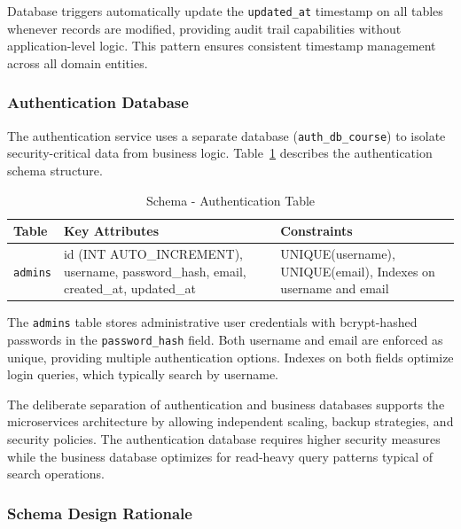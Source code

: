 \documentclass[12pt,a4paper]{article}
\begin{document}
Database triggers automatically update the \texttt{updated\_at} timestamp on all tables whenever records are modified, providing audit trail capabilities without application-level logic. This pattern ensures consistent timestamp management across all domain entities.

\subsubsection{Authentication Database}

The authentication service uses a separate database (\texttt{auth\_db\_course}) to isolate security-critical data from business logic. Table~\ref{tab:mysql_schema} describes the authentication schema structure.\newline

\begin{table}[htbp]
	\centering
	\caption{Schema - Authentication Table}
	\label{tab:mysql_schema}
	\small
	\begin{tabular}{@{}lp{6cm}p{3cm}@{}}
		\toprule
		\textbf{Table} & \textbf{Key Attributes} & \textbf{Constraints} \\ 
		\midrule
		\texttt{admins} & id (INT AUTO\_INCREMENT), username, password\_hash, email, created\_at, updated\_at & UNIQUE(username), UNIQUE(email), Indexes on username and email \\
		\bottomrule
	\end{tabular}
\end{table}

The \texttt{admins} table stores administrative user credentials with bcrypt-hashed passwords in the \texttt{password\_hash} field. Both username and email are enforced as unique, providing multiple authentication options. Indexes on both fields optimize login queries, which typically search by username.\newline

The deliberate separation of authentication and business databases supports the microservices architecture by allowing independent scaling, backup strategies, and security policies. The authentication database requires higher security measures while the business database optimizes for read-heavy query patterns typical of search operations.\newline

\subsubsection{Schema Design Rationale}
\end{document}
